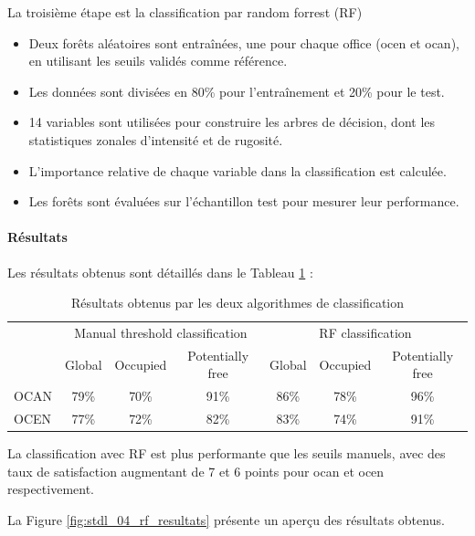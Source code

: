 \par{La troisième étape est la classification par random forrest (RF)}
\begin{itemize}
    \item Deux forêts aléatoires sont entraînées, une pour chaque office (\acrshort{ocen} et \acrshort{ocan}), en utilisant les seuils validés comme référence.
    \item Les données sont divisées en 80\% pour l'entraînement et 20\% pour le test.
    \item 14 variables sont utilisées pour construire les arbres de décision, dont les statistiques zonales d'intensité et de rugosité.
    \item L'importance relative de chaque variable dans la classification est calculée.
    \item Les forêts sont évaluées sur l'échantillon test pour mesurer leur performance.
\end{itemize}

\paragraph{Résultats}
\par{Les résultats obtenus sont détaillés dans le Tableau \ref{tab:stdl_01_resultats_classification} :}
\begin{table}[H]
    \centering
    \begin{tabular}{|l|c|c|c||c|c|c|}
    \hline
    \multirow{2}{*}{} & \multicolumn{3}{c||}{Manual threshold classification} & \multicolumn{3}{c|}{RF classification} \\
    \cline{2-7}
    & Global & Occupied & Potentially free & Global & Occupied & Potentially free \\
    \hline
    OCAN & 79\% & 70\% & 91\% & 86\% & 78\% & 96\% \\
    OCEN & 77\% & 72\% & 82\% & 83\% & 74\% & 91\% \\
    \hline
    \end{tabular}
    \caption{Résultats obtenus par les deux algorithmes de classification}
    \label{tab:stdl_01_resultats_classification}
\end{table}
\par{La classification avec RF est plus performante que les seuils manuels, avec des taux de satisfaction augmentant de 7 et 6 points pour \acrshort{ocan} et \acrshort{ocen} respectivement.}

La Figure \ref{fig:stdl_04_rf_resultats} présente un aperçu des résultats obtenus.


